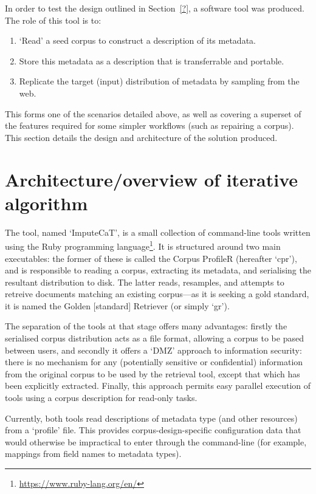 In order to test the design outlined in Section~\ref{?}, a software tool was produced.  The role of this tool is to:

\begin{enumerate}
    \item `Read' a seed corpus to construct a description of its metadata.
    \item Store this metadata as a description that is transferrable and portable.
    \item Replicate the target (input) distribution of metadata by sampling from the web.
\end{enumerate}

This forms one of the scenarios detailed above, as well as covering a superset of the features required for some simpler workflows (such as repairing a corpus).  This section details the design and architecture of the solution produced.


\section{Architecture/overview of iterative algorithm}
The tool, named `ImputeCaT', is a small collection of command-line tools written using the Ruby programming language\footnote{\url{https://www.ruby-lang.org/en/}}. It is structured around two main executables: the former of these is called the Corpus ProfileR (hereafter `cpr'), and is responsible to reading a corpus, extracting its metadata, and serialising the resultant distribution to disk.  The latter reads, resamples, and attempts to retreive documents matching an existing corpus---as it is seeking a gold standard, it is named the Golden [standard] Retriever (or simply `gr').

The separation of the tools at that stage offers many advantages: firstly the serialised corpus distribution acts as a file format, allowing a corpus to be pased between users, and secondly it offers a `DMZ' approach to information security: there is no mechanism for any (potentially sensitive or confidential) information from the original corpus to be used by the retrieval tool, except that which has been explicitly extracted.  Finally, this approach permits easy parallel execution of tools using a corpus description for read-only tasks.


Currently, both tools read descriptions of metadata type (and other resources) from a `profile' file.  This provides corpus-design-specific configuration data that would otherwise be impractical to enter through the command-line (for example, mappings from field names to metadata types).




